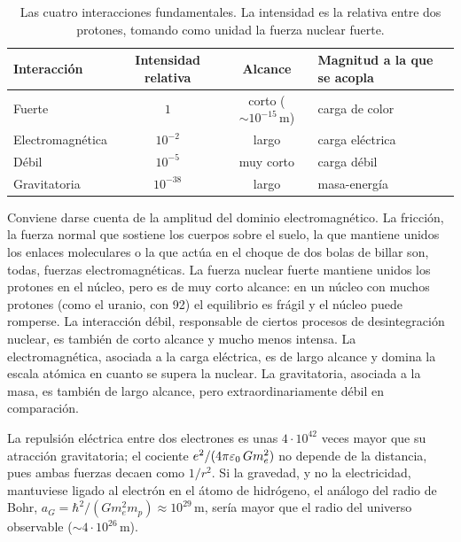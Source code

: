 \begin{table}[ht]
\centering
\caption{Las cuatro interacciones fundamentales. La intensidad es la relativa entre
dos protones, tomando como unidad la fuerza nuclear fuerte.}
\label{tab:fuerzas}
\small
\renewcommand{\arraystretch}{1.3}
\begin{tabular}{@{}lccl@{}}
\toprule
Interacción & Intensidad relativa & Alcance & Magnitud a la que se acopla\\
\midrule
Fuerte          & $1$          & corto ($\sim10^{-15}\,\mathrm{m}$) & carga de color\\
Electromagnética& $10^{-2}$    & largo                              & carga eléctrica\\
Débil           & $10^{-5}$    & muy corto                          & carga débil\\
Gravitatoria    & $10^{-38}$   & largo                              & masa-energía\\
\bottomrule
\end{tabular}
\end{table}

Conviene darse cuenta de la amplitud del dominio electromagnético. La fricción, la fuerza
normal que sostiene los cuerpos sobre el suelo, la que mantiene unidos los enlaces
moleculares o la que actúa en el choque de dos bolas de billar son, todas, fuerzas
electromagnéticas. La fuerza nuclear fuerte mantiene unidos los protones en el núcleo, pero
es de muy corto alcance: en un núcleo con muchos protones (como el uranio, con 92) el equilibrio es
frágil y el núcleo puede romperse. La interacción débil, responsable de ciertos procesos de
desintegración nuclear, es también de corto alcance y mucho menos intensa. La
electromagnética, asociada a la carga eléctrica, es de largo alcance y domina la escala
atómica en cuanto se supera la nuclear. La gravitatoria, asociada a la masa, es también de
largo alcance, pero extraordinariamente débil en comparación.

\begin{observacion}\label{obs:gravedad}
La repulsión eléctrica entre dos electrones es unas $4\cdot10^{42}$ veces mayor que su
atracción gravitatoria; el cociente $e^{2}/(4\pi\varepsilon_{0}\,Gm_e^{2})$ no depende de la distancia, pues ambas
fuerzas decaen como $1/r^{2}$. Si la gravedad, y no la electricidad, mantuviese ligado al
electrón en el átomo de hidrógeno, el análogo del radio de Bohr,
$a_G=\hbar^{2}/(Gm_e^{2}m_p)\approx10^{29}\,\mathrm{m}$, sería mayor que el radio del
universo observable ($\sim4\cdot10^{26}\,\mathrm{m}$).
\end{observacion}

